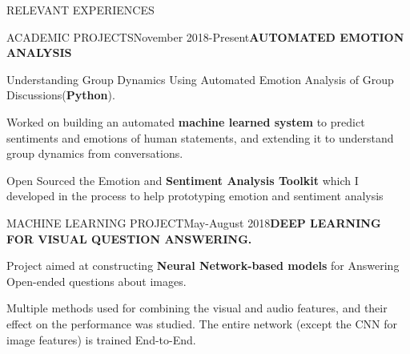 \documentclass{resume} %
\begin{document}
\begin{rSection}{RELEVANT EXPERIENCES}
\begin{rSubsection}{ACADEMIC PROJECTS}{November 2018-Present}{\textbf{AUTOMATED EMOTION ANALYSIS}}{}
\item Understanding Group Dynamics Using Automated Emotion Analysis of Group Discussions(\textbf{Python}).
\item Worked on building an automated \textbf{machine learned system} to predict sentiments and emotions of human statements, and extending it to understand group dynamics from conversations.
\item Open Sourced the Emotion and \textbf{Sentiment Analysis Toolkit} which I developed in the process to help prototyping emotion and sentiment analysis
\end{rSubsection}
\begin{rSubsection}{MACHINE LEARNING PROJECT}{May-August 2018}{\textbf{DEEP LEARNING FOR VISUAL QUESTION ANSWERING.}}{\textbf{}}{}

\item  Project aimed at constructing \textbf{Neural Network-based models} for Answering Open-ended questions about images. 
\item  Multiple methods used for combining the visual and audio features, and their effect on the performance was studied. The entire network (except the CNN for image features) is trained End-to-End.
\end{rSubsection}




\end{rSection}
\end{document}
